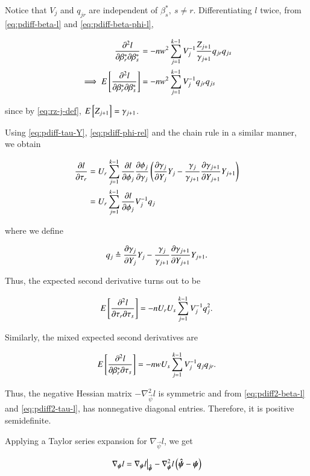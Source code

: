 \documentclass[journal,12pt,twocolumn]{IEEEtran}
\begin{document}
Notice that \(V_j\) and \(q_{jr}\) are independent of \(\beta^*_s,\ s \neq r\).
Differentiating \(l\) twice, from \eqref{eq:pdiff-beta-l} and
\eqref{eq:pdiff-beta-phi-l},

\begin{align}
     \frac{\partial^2l}{\partial \beta_r^* \partial \beta_s^*} &= -nw^2\sum_{j=1}^{k-1}V_j^{-1}\frac{Z_{j+1}}{\gamma_{j+1}}q_{jr}q_{js} \\
     \implies \mean{\frac{\partial^2l}{\partial \beta_r^* \partial \beta_s^*}} &= -nw^2\sum_{j=1}^{k-1}V_j^{-1}q_{jr}q_{js}
     \label{eq:pdiff2-beta-l}
\end{align}

since by \eqref{eq:rz-j-def}, \(E\left[ Z_{j+1} \right] = \gamma_{j+1}\).

Using \eqref{eq:pdiff-tau-Y}, \eqref{eq:pdiff-phi-rel} and the chain rule in a
similar manner, we obtain

\begin{align}
     \pdiff{\tau_r}{l} &= U_r\sum_{j=1}^{k-1}\pdiff{\phi_j}{l}\pdiff{\gamma_j}{\phi_j}\brak{\pdiff{Y_j}{\gamma_j}Y_j - \frac{\gamma_j}{\gamma_{j+1}}\pdiff{Y_{j+1}}{\gamma_{j+1}}Y_{j+1}} \\
                       &= U_r\sum_{j=1}^{k-1}\pdiff{\phi_j}{l}V_j^{-1}q_j
                       \label{eq:pdiff-tau-l}
\end{align}

where we define

\begin{equation}
     q_j \triangleq \pdiff{Y_j}{\gamma_j}Y_j - \frac{\gamma_j}{\gamma_{j+1}}\pdiff{Y_{j+1}}{\gamma_{j+1}}Y_{j+1}.
     \label{eq:qj-def}
\end{equation}

Thus, the expected second derivative turns out to be

\begin{equation}
     \mean{\frac{\partial^2l}{\partial \tau_r \partial \tau_s}} = -nU_rU_s\sum_{j=1}^{k-1}V_j^{-1}q_j^2.
     \label{eq:pdiff2-tau-l}
\end{equation}

Similarly, the mixed expected second derivatives are

\begin{equation}
     \mean{\frac{\partial^2l}{\partial \beta_r^* \partial \tau_s}} = -nwU_s\sum_{j=1}^{k-1}V_j^{-1}q_jq_{jr}.
     \label{eq:pdiff-2-beta-tau}
\end{equation}

Thus, the negative Hessian matrix \(-\nabla^2_{\vec{\psi}}l\) is symmetric and
from \eqref{eq:pdiff2-beta-l} and \eqref{eq:pdiff2-tau-l}, has nonnegative
diagonal entries. Therefore, it is positive semidefinite.

Applying a Taylor series expansion for \(\nabla_{\vec{\psi}}l\), we get

\begin{align}
     \nabla_{\boldsymbol{\mathbf{\psi}}}l = \nabla_{\boldsymbol{\mathbf{\psi}}}l\big|_{\boldsymbol{\mathbf{\hat{\psi}}}} - \nabla^2_{\boldsymbol{\mathbf{\psi}}}l\left(\boldsymbol{\mathbf{\hat{\psi}}}-\boldsymbol{\mathbf{\psi}}\right)
\end{align}


\end{document}
